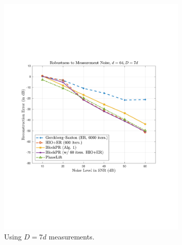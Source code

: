 \begin{figure}[hbtp]
\centering
\begin{subfigure}[b]{0.495\textwidth}
\centering
\includegraphics[clip=true, trim = 0.75in 2.75in 1in 2.5in,scale=0.45]{pics/robustness_600a}
\caption{Using $D=7d$ measurements.}
\label{fig:noise-7d}
\end{subfigure}
\hfill
\begin{subfigure}[b]{0.495\textwidth}
\centering

\end{subfigure}
\end{figure}

